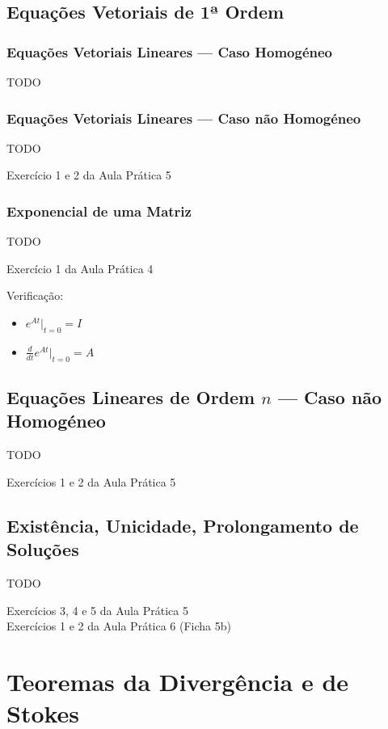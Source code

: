 \documentclass[11pt, a4paper]{article}
\begin{document}
\subsection{Equações Vetoriais de 1ª Ordem}

\subsubsection{Equações Vetoriais Lineares — Caso Homogéneo}

TODO

\subsubsection{Equações Vetoriais Lineares — Caso não Homogéneo}

TODO

Exercício 1 e 2 da Aula Prática 5

\subsubsection{Exponencial de uma Matriz}

TODO

Exercício 1 da Aula Prática 4

Verificação:
\begin{itemize}
    \item $\displaystyle e^{At}|_{t=0} = I$
    \item $\displaystyle \frac{d}{dt}e^{At}|_{t=0} = A $
\end{itemize}

\subsection{Equações Lineares de Ordem $n$ — Caso não Homogéneo}

TODO

Exercícios 1 e 2 da Aula Prática 5

\subsection{Existência, Unicidade, Prolongamento de Soluções}

TODO

Exercícios 3, 4 e 5 da Aula Prática 5 \\
Exercícios 1 e 2 da Aula Prática 6 (Ficha 5b)

\newpage

\section{Teoremas da Divergência e de Stokes}
\end{document}
